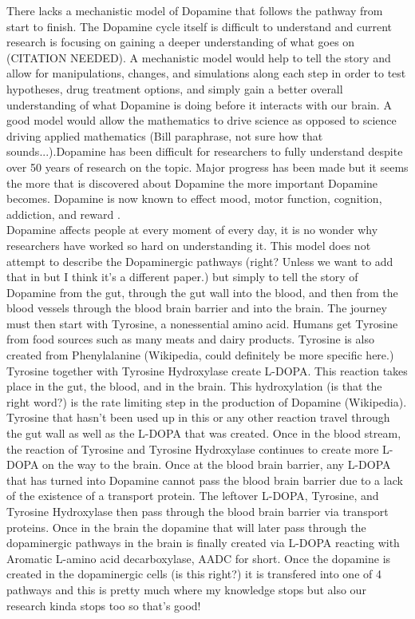 \documentclass[smallextended]{svjour3}
\begin{document}
There lacks a mechanistic model of Dopamine that follows the pathway from start to finish. The Dopamine cycle itself is difficult to understand and current research is focusing on gaining a deeper understanding of what goes on (CITATION NEEDED). A mechanistic model would help to tell the story and allow for manipulations, changes, and simulations along each step in order to test hypotheses, drug treatment options, and simply gain a better overall understanding of what Dopamine is doing before it interacts with our brain. A good model would allow the mathematics to drive science as opposed to science driving applied mathematics (Bill paraphrase, not sure how that sounds...).Dopamine has been difficult for researchers to fully understand despite over 50 years of research on the topic. Major progress has been made but it seems the more that is discovered about Dopamine the more important Dopamine becomes. Dopamine is now known to effect mood, motor function, cognition, addiction, and reward \cite{Ref34}. \\
%
\indent Dopamine affects people at every moment of every day, it is no wonder why researchers have worked so hard on understanding it. This model does not attempt to describe the Dopaminergic pathways (right? Unless we want to add that in but I think it's a different paper.) but simply to tell the story of Dopamine from the gut, through the gut wall into the blood, and then from the blood vessels through the blood brain barrier and into the brain. The journey must then start with Tyrosine, a nonessential amino acid. Humans get Tyrosine from food sources such as many meats and dairy products. Tyrosine is also created from Phenylalanine (Wikipedia, could definitely be more specific here.) Tyrosine together with Tyrosine Hydroxylase create L-DOPA. This reaction takes place in the gut, the blood, and in the brain. This hydroxylation (is that the right word?) is the rate limiting step in the production of Dopamine (Wikipedia). Tyrosine that hasn't been used up in this or any other reaction travel through the gut wall as well as the L-DOPA that was created. Once in the blood stream, the reaction of Tyrosine and Tyrosine Hydroxylase continues to create more L-DOPA on the way to the brain. Once at the blood brain barrier, any L-DOPA that has turned into Dopamine cannot pass the blood brain barrier due to a lack of the existence of a transport protein. The leftover L-DOPA, Tyrosine, and Tyrosine Hydroxylase then pass through the blood brain barrier via transport proteins. Once in the brain the dopamine that will later pass through the dopaminergic pathways in the brain is finally created via L-DOPA reacting with Aromatic L-amino acid decarboxylase, AADC for short. Once the dopamine is created in the dopaminergic cells (is this right?) it is transfered into one of 4 pathways and this is pretty much where my knowledge stops but also our research kinda stops too so that's good! \\
\end{document}
